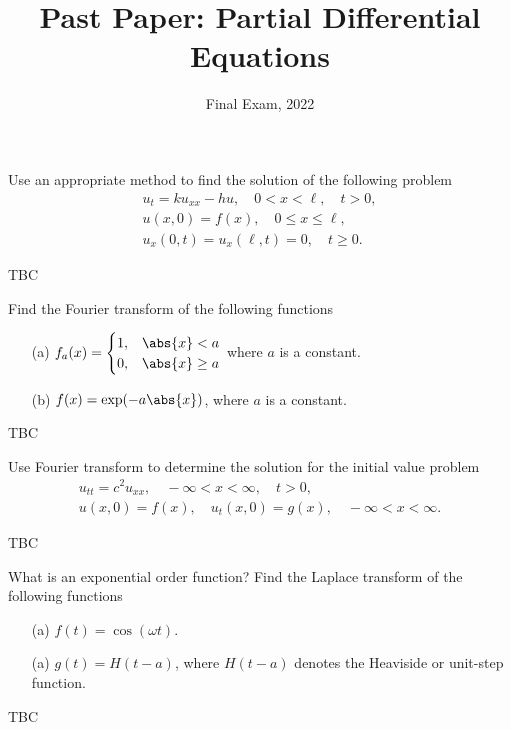 \documentclass[11pt]{penrose}
\title{Past Paper: Partial Differential Equations}
\subtitle{Final Exam, 2022}
\begin{document}
\maketitle
\warningtext

\begin{problem}{1}
    Use an appropriate method to find the solution of the following problem
    \begin{gather*}
        u_t = k u_{xx} - h u, \quad 0 < x < \ell, \quad t > 0,\\
        u(x, 0) = f(x), \quad 0 \leq x \leq \ell,\\
        u_x(0, t) = u_x(\ell, t) = 0, \quad t \geq 0.
    \end{gather*}
    
    \solution TBC
\end{problem}

\begin{problem}{2}
    Find the Fourier transform of the following functions
    \begin{enumerate}
        \item[(a)] $f_a(x) = \begin{cases} 1, &\abs{x} < a \\ 0, &\abs{x} \geq a \end{cases}$ where $a$ is a constant.
        \item[(b)] $f(x) = \exp(-a \abs{x})$, where $a$ is a constant.
    \end{enumerate}
    
    \solution TBC
\end{problem}

\begin{problem}{3}
    Use Fourier transform to determine the solution for the initial value problem
    \begin{gather*}
        u_{tt} = c^2 u_{xx}, \quad -\infty < x < \infty, \quad t > 0,\\
        u(x,0) = f(x), \quad u_{t}(x,0) = g(x), \quad -\infty < x < \infty.
    \end{gather*}
    
    \solution TBC
\end{problem}

\begin{problem}{4}
    What is an exponential order function? Find the Laplace transform of the following functions
    \begin{enumerate}
        \item[(a)] $f(t) = \cos(\omega t)$.
        \item[(a)] $g(t) = H(t-a)$, where $H(t-a)$ denotes the Heaviside or unit-step function.
    \end{enumerate}
    
    \solution TBC
\end{problem}
\end{document}

